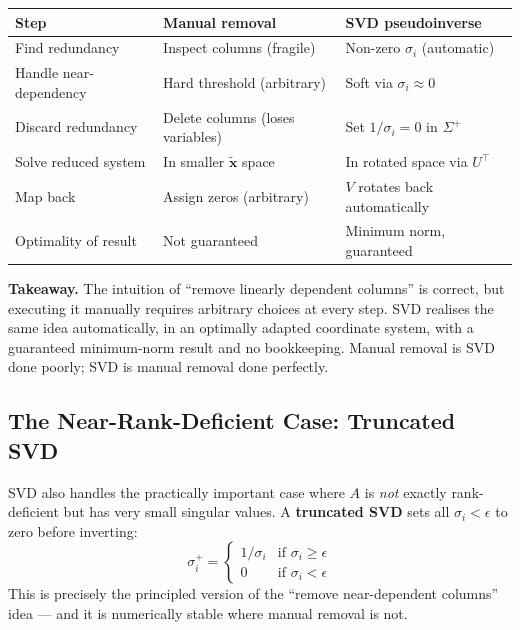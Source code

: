 \documentclass[12pt, a4paper]{article}
\theoremstyle{definition}
\begin{document}
\begin{center}
\small
\renewcommand{\arraystretch}{1.5}
\begin{tabular}{lll}
    \toprule
    \textbf{Step} & \textbf{Manual removal} & \textbf{SVD pseudoinverse} \\
    \midrule
    Find redundancy     & Inspect columns (fragile)          & Non-zero $\sigma_i$ (automatic) \\
    Handle near-dependency & Hard threshold (arbitrary)      & Soft via $\sigma_i \approx 0$ \\
    Discard redundancy  & Delete columns (loses variables)   & Set $1/\sigma_i = 0$ in $\Sigma^+$ \\
    Solve reduced system & In smaller $\tilde{\mathbf{x}}$ space & In rotated space via $U^\top$ \\
    Map back            & Assign zeros (arbitrary)           & $V$ rotates back automatically \\
    Optimality of result & Not guaranteed                    & Minimum norm, guaranteed \\
    \bottomrule
\end{tabular}
\end{center}

\begin{keybox}
\textbf{Takeaway.} The intuition of ``remove linearly dependent columns'' is correct, but executing it
manually requires arbitrary choices at every step. SVD realises the same idea automatically, in an
optimally adapted coordinate system, with a guaranteed minimum-norm result and no bookkeeping.
Manual removal is SVD done poorly; SVD is manual removal done perfectly.
\end{keybox}

\subsection{The Near-Rank-Deficient Case: Truncated SVD}

SVD also handles the practically important case where $A$ is \emph{not} exactly rank-deficient but
has very small singular values. A \textbf{truncated SVD} sets all $\sigma_i < \epsilon$ to zero
before inverting:
\[
    \sigma_i^+ = \begin{cases} 1/\sigma_i & \text{if } \sigma_i \geq \epsilon \\ 0 & \text{if } \sigma_i < \epsilon \end{cases}
\]
This is precisely the principled version of the ``remove near-dependent columns'' idea — and it is
numerically stable where manual removal is not.
\end{document}
